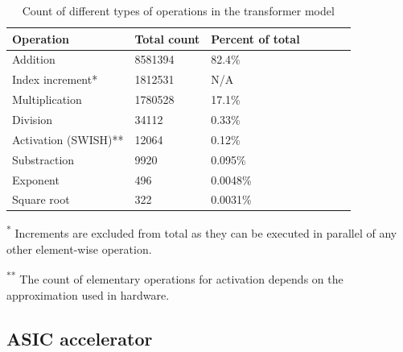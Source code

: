\documentclass[12pt]{article}
\begin{document}
    \begin{table}[ht]
        \centering
        \renewcommand{\arraystretch}{1.2} %
        \setlength{\arrayrulewidth}{1.5pt} %
        \caption{Count of different types of operations in the transformer model}
        \begin{tabular}{@{} *7l @{}} 
            \toprule
            Operation            & Total count & Percent of total &&&  \\\midrule
            Addition             & 8581394     & 82.4\%   \\
            Index increment*     & 1812531     & N/A      \\
            Multiplication       & 1780528     & 17.1\%   \\
            Division             & 34112       & 0.33\%   \\
            Activation (SWISH)** & 12064       & 0.12\%   \\
            Substraction         & 9920        & 0.095\%  \\
            Exponent             & 496         & 0.0048\% \\
            Square root          & 322         & 0.0031\% \\
            \hline
        \end{tabular}
        \begin{minipage}{\textwidth}
            \footnotesize
            \textsuperscript{*} Increments are excluded from total as they can be executed in parallel of any other element-wise operation.

            \textsuperscript{**} The count of elementary operations for activation depends on the approximation used in hardware.
        \end{minipage}
        \label{tab:num_ops}
    \end{table}

    \subsection{ASIC accelerator}

    \newpage
    \printbibliography
\end{document}
